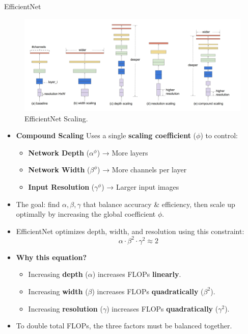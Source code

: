 \begin{frame}[allowframebreaks]{EfficientNet}
    \begin{figure}
        \centering
        \includegraphics[width=1.05\linewidth]{images/cnn/ENet_1.png}
        \caption*{EfficientNet Scaling.}
    \end{figure}

\framebreak

    \begin{itemize}
        \item \textbf{Compound Scaling} Uses a single \textbf{scaling coefficient} (\(\phi\)) to control:
        \begin{itemize}
        \item \textbf{Network Depth} (\(\alpha^\phi\)) → More layers
        \item \textbf{Network Width} (\(\beta^\phi\)) → More channels per layer
        \item \textbf{Input Resolution} (\(\gamma^\phi\)) → Larger input images
    \end{itemize}
        \item The goal: find \(\alpha, \beta, \gamma\) that balance accuracy \& efficiency, then scale up optimally by increasing the global coefficient \(\phi\).
    \end{itemize}

\framebreak

    \begin{itemize}
        \item EfficientNet optimizes depth, width, and resolution using this constraint:
        \[
        \alpha \cdot \beta^2 \cdot \gamma^2 \approx 2
        \]
        \item \textbf{Why this equation?}
        \begin{itemize}
            \item Increasing \textbf{depth} (\(\alpha\)) increases FLOPs \textbf{linearly}.
            \item Increasing \textbf{width} (\(\beta\)) increases FLOPs \textbf{quadratically} (\(\beta^2\)).
            \item Increasing \textbf{resolution} (\(\gamma\)) increases FLOPs \textbf{quadratically} (\(\gamma^2\)).
        \end{itemize}
        \item To double total FLOPs, the three factors must be balanced together.
    \end{itemize}


\end{frame}
